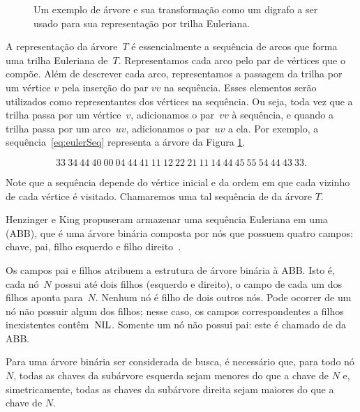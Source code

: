 \begin{figure}[htb]
\centering


\caption{Um exemplo de árvore e sua transformação como um digrafo a ser usado para sua representação por trilha Euleriana.}
\label{fig:exemploSeqEuler}
\end{figure}

A representação da árvore~$T$ é essencialmente a sequência de arcos que forma uma trilha Euleriana de~$T$. Representamos cada arco pelo par de vértices que o compõe. Além de descrever cada arco, representamos a passagem da trilha por um vértice $v$ pela inserção do par $vv$ na sequência. Esses elementos serão utilizados como representantes dos vértices na sequência. Ou seja, toda vez que a trilha passa por um vértice~$v$, adicionamos o par~$vv$ à sequência, e quando a trilha passa por um arco~$uv$, adicionamos o par~$uv$ a ela. Por exemplo, a sequência~\eqref{eq:eulerSeq} representa a árvore da  Figura \ref{fig:exemploSeqEuler}.

\begin{equation}
33~34~44~40~00~04~44~41~11~12~22~21~11~14~44~45~55~54~44~43~33.\label{eq:eulerSeq}  
\end{equation}



Note que a sequência depende do vértice inicial e da ordem em que cada vizinho de cada vértice é visitado. Chamaremos uma tal sequência de  da árvore $T$.

Henzinger e King \cite{HenzingerKing} propuseram armazenar uma sequência Euleriana em uma  (ABB), que é uma árvore binária composta por nós que possuem  quatro campos: chave, pai, filho esquerdo e filho direito~\cite{CLRS}.

Os campos pai e filhos atribuem a estrutura de árvore binária à ABB. Isto é, cada nó~$N$ possui até dois filhos (esquerdo e direito), o campo  de cada um dos filhos aponta para~$N$. Nenhum nó é filho de dois outros nós. Pode ocorrer de um nó não possuir algum dos filhos; nesse caso, os campos correspondentes a filhos inexistentes contêm~$\text{NIL}$. Somente um nó não possui pai: este é chamado de  da ABB.

Para uma árvore binária ser considerada de busca, é necessário que, para todo nó $N$, todas as chaves da subárvore esquerda sejam menores do que a chave de $N$ e, simetricamente, todas as chaves da subárvore direita sejam maiores do que a chave de $N$.

